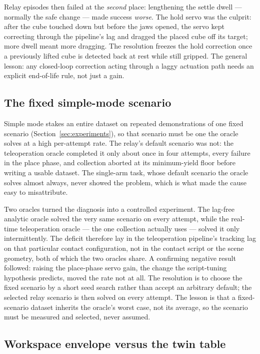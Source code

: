 Relay episodes then failed at the \emph{second} place: lengthening the
settle dwell --- normally the safe change --- made success \emph{worse}.
The hold servo was the culprit: after the cube touched down but before
the jaws opened, the servo kept correcting through the pipeline's lag
and dragged the placed cube off its target; more dwell meant more
dragging. The resolution freezes the hold correction once a previously
lifted cube is detected back at rest while still gripped. The general
lesson: any closed-loop correction acting through a laggy actuation
path needs an explicit end-of-life rule, not just a gain.

\subsection{The fixed simple-mode scenario}
\label{sec:diff-simpleseed}

Simple mode stakes an entire dataset on repeated demonstrations of one
fixed scenario (Section~\ref{sec:experiments}), so that scenario must be
one the oracle solves at a high per-attempt rate. The relay's default
scenario was not: the teleoperation oracle completed it only about once
in four attempts, every failure in the place phase, and collection
aborted at its minimum-yield floor before writing a usable dataset. The
single-arm task, whose default scenario the oracle solves almost always,
never showed the problem, which is what made the cause easy to
misattribute.

Two oracles turned the diagnosis into a controlled experiment. The
lag-free analytic oracle solved the very same scenario on every attempt,
while the real-time teleoperation oracle --- the one collection actually
uses --- solved it only intermittently. The deficit therefore lay in the
teleoperation pipeline's tracking lag on that particular contact
configuration, not in the contact script or the scene geometry, both of
which the two oracles share. A confirming negative result followed:
raising the place-phase servo gain, the change the script-tuning
hypothesis predicts, moved the rate not at all. The resolution is to
choose the fixed scenario by a short seed search rather than accept an
arbitrary default; the selected relay scenario is then solved on every
attempt. The lesson is that a fixed-scenario dataset inherits the
oracle's worst case, not its average, so the scenario must be measured
and selected, never assumed.

\subsection{Workspace envelope versus the twin table}
\label{sec:diff-envelope}

